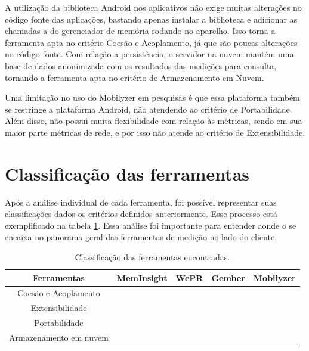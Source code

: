 \documentclass[12pt]{tcc}
\newcommand{\cmark}{\ding{51}}
\newcommand{\xmark}{\ding{55}}
\begin{document}
	A utilização da biblioteca Android nos aplicativos não exige muitas alterações no código fonte das aplicações, bastando apenas instalar a biblioteca e adicionar as chamadas a  do gerenciador de memória rodando no aparelho. Isso torna a ferramenta apta no critério Coesão e Acoplamento, já que são poucas alterações no código fonte. Com relação a persistência, o servidor na nuvem mantém uma base de dados anonimizada com os resultados das medições para consulta, tornando a ferramenta apta no critério de Armazenamento em Nuvem.

	Uma limitação no uso do Mobilyzer em pesquisas é que essa plataforma também se restringe a plataforma Android, não atendendo ao critério de Portabilidade. Além disso, não possui muita flexibilidade com relação às métricas, sendo em sua maior parte métricas de rede, e por isso não atende ao critério de Extensibilidade.
		
	\section{Classificação das ferramentas}
	\label{section:analise-ferramentas}
	Após a análise individual de cada ferramenta, foi possível representar suas classificações dados os critérios definidos anteriormente. Esse processo está exemplificado na tabela \ref{table:classificacao-sem-elc}. Essa análise foi importante para entender aonde o  se encaixa no panorama geral das ferramentas de medição no lado do cliente.

	\begin{table}[ht]
	\caption{Classificação das ferramentas encontradas.} %
	\centering %
	\begin{tabular}{c c c c c } %
	\toprule %

	\textbf{Ferramentas} &\textbf{MemInsight} & \textbf{WePR} & \textbf{Gember} & \textbf{Mobilyzer}  \\ [0.4ex]

	\midrule %
	Coesão e Acoplamento & \cmark & \cmark & \cmark & \cmark   \\
	Extensibilidade & \xmark & \xmark & \xmark & \xmark  \\
	Portabilidade & \cmark & \xmark & \xmark & \xmark  \\
	Armazenamento em nuvem & \xmark & \cmark & \cmark & \cmark  \\
	\bottomrule %
	\end{tabular}
	\label{table:classificacao-sem-elc} %
	\end{table}
\end{document}
